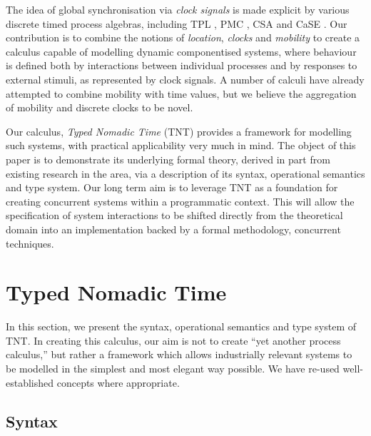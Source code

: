 \documentclass[orivec,envcountsame]{llncs}
\begin{document}
The idea of global synchronisation via \emph{clock signals} is made
explicit by various discrete timed process algebras, including TPL
\cite{hennessy:tpl}, PMC \cite{pmc}, CSA \cite{csa} and CaSE
\cite{case,norton05alg}. Our contribution is to combine the notions of
\emph{location}, \emph{clocks} and \emph{mobility} to create a calculus
capable of modelling dynamic componentised systems, where behaviour is
defined both by interactions between individual processes and by
responses to external stimuli, as represented by clock signals.  A
number of calculi \cite{lee:realtime,satoh:phd,webpi} have already
attempted to combine mobility with  time
values, but we believe the aggregation of mobility
and discrete clocks to be novel.

Our calculus, \emph{Typed Nomadic Time} (TNT) provides a framework for
modelling such systems, with practical
applicability very much in mind. The object of this
paper is to demonstrate its underlying formal theory, derived in part
from existing research in the area, via a description of its syntax,
operational semantics and type system. Our long term aim is to leverage
TNT as a foundation for creating concurrent systems within a
programmatic context. This will allow the specification of system interactions to be shifted directly from the
theoretical domain into an implementation backed by a formal
methodology,  concurrent
techniques.

\section{Typed Nomadic Time}
\label{tnt}

In this section, we present the syntax, operational semantics and type
system of TNT. In creating this calculus, our aim is not to create ``yet
another process calculus,'' but rather a framework which allows
industrially relevant systems to be modelled in the simplest and most
elegant way possible. We have re-used well-established concepts where
appropriate.

\subsection{Syntax}
\end{document}

